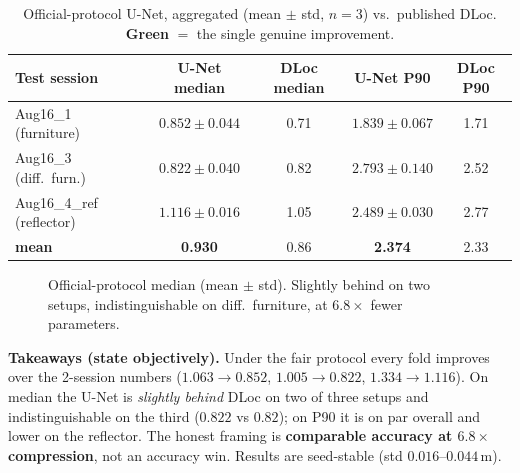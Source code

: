\documentclass[11pt,a4paper]{article}
\newcommand{\best}[1]{\textcolor{ours}{\textbf{#1}}}
\begin{document}
\begin{table}[H]
\centering
\caption{Official-protocol U-Net, aggregated (mean $\pm$ std, $n=3$) vs.\ published DLoc.
\best{Green} $=$ the single genuine improvement.}
\begin{tabular}{@{}lcccc@{}}
\toprule
Test session & U-Net median & DLoc median & U-Net P90 & DLoc P90 \\
\midrule
Aug16\_1 (furniture)      & $0.852\pm0.044$ & 0.71 & $1.839\pm0.067$ & 1.71 \\
Aug16\_3 (diff.\ furn.)   & $0.822\pm0.040$ & 0.82 & $2.793\pm0.140$ & 2.52 \\
Aug16\_4\_ref (reflector) & $1.116\pm0.016$ & 1.05 & \best{$2.489\pm0.030$} & 2.77 \\
\midrule
\textbf{mean} & \textbf{0.930} & 0.86 & \textbf{2.374} & 2.33 \\
\bottomrule
\end{tabular}
\end{table}

\begin{figure}[H]
\centering
{}
\caption{Official-protocol median (mean $\pm$ std). Slightly behind on two setups, indistinguishable
on diff.\ furniture, at $6.8\times$ fewer parameters.}
\end{figure}

\textbf{Takeaways (state objectively).} Under the fair protocol every fold improves over the
2-session numbers ($1.063\!\to\!0.852$, $1.005\!\to\!0.822$, $1.334\!\to\!1.116$). On median the
U-Net is \emph{slightly behind} DLoc on two of three setups and indistinguishable on the third
($0.822$ vs $0.82$); on P90 it is on par overall and lower on the reflector. The honest framing is
\textbf{comparable accuracy at $6.8\times$ compression}, not an accuracy win. Results are
seed-stable (std $0.016$--$0.044$\,m).
\end{document}
